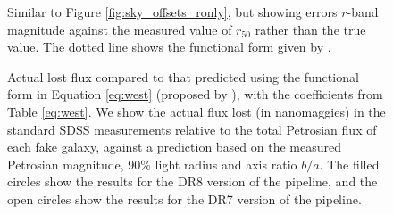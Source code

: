 \clearpage
{}
\begin{figure}
\figurenum{\fignum}
\caption{\label{fig:sky_offsets_vs_r50meas} Similar to Figure
  \ref{fig:sky_offsets_ronly}, but showing errors $r$-band magnitude against
  the measured value of $r_{50}$ rather than the true value. The
  dotted line shows the functional form given by \citet{hyde09a}.}
\end{figure}

\clearpage
{}
\begin{figure}
\figurenum{\fignum}
\caption{\label{fig:sky_offsets_vs_west} Actual lost flux compared to
  that predicted using the functional form in Equation \ref{eq:west}
  (proposed by \citealt{west10a}), with the coefficients from Table
  \ref{eq:west}.  We show the actual flux lost (in nanomaggies) in the
  standard SDSS measurements relative to the total Petrosian flux of
  each fake galaxy, against a prediction based on the measured
  Petrosian magnitude, 90\% light radius and axis ratio $b/a$. The
  filled circles show the results for the DR8 version of the pipeline,
  and the open circles show the results for the DR7 version of the
  pipeline.}
\end{figure}

